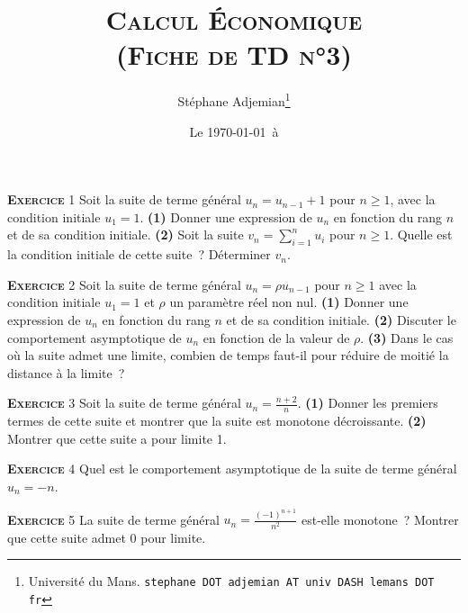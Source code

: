 \documentclass[10pt,a4paper,notitlepage]{article}
\newcommand{\exercice}[1]{\textsc{\textbf{Exercice}} #1}
\begin{document}
\title{\textsc{Calcul Économique\\ \small{(Fiche de TD n°3)}}}
\author{Stéphane Adjemian\thanks{Université du Mans. \texttt{stephane DOT adjemian AT univ DASH lemans DOT fr}}}
\date{Le \today\ à \thistime}

\maketitle

\exercice{1} Soit la suite de terme général $u_n = u_{n-1} + 1$ pour
$n \geq 1$, avec la condition initiale $u_1 = 1$. \textbf{(1)} Donner
une expression de $u_n$ en fonction du rang $n$ et de sa condition
initiale. \textbf{(2)} Soit la suite $v_n = \sum_{i=1}^n u_i$ pour
$n\geq 1$. Quelle est la condition initiale de cette suite ?
Déterminer $v_n$.

\bigskip

\exercice{2} Soit la suite de terme général $u_n = \rho u_{n-1}$ pour
$n \geq 1$ avec la condition initiale $u_1 = 1$ et $\rho$ un paramètre
réel non nul. \textbf{(1)} Donner une expression de $u_n$ en fonction
du rang $n$ et de sa condition initiale. \textbf{(2)} Discuter le
comportement asymptotique de $u_n$ en fonction de la valeur de
$\rho$. \textbf{(3)} Dans le cas où la suite admet une limite, combien
de temps faut-il pour réduire de moitié la distance à la limite ?

\bigskip

\exercice{3} Soit la suite de terme général $u_n =
\frac{n+2}{n}$. \textbf{(1)} Donner les premiers termes de cette suite
et montrer que la suite est monotone décroissante. \textbf{(2)}
Montrer que cette suite a pour limite 1.

\bigskip

\exercice{4} Quel est le comportement asymptotique de la suite de
terme général $u_n = -n$.

\bigskip

\exercice{5} La suite de terme général $u_n = \frac{(-1)^{n+1}}{n^2}$
est-elle monotone ? Montrer que cette suite admet 0 pour limite.

\bigskip
\end{document}
